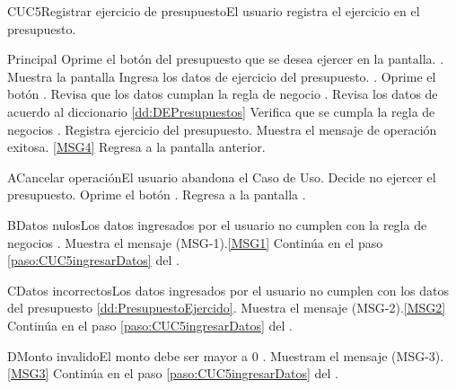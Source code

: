 
	\begin{UseCase}{CUC5}{Registrar ejercicio de presupuesto}{El usuario registra el ejercicio en el presupuesto.}
	\end{UseCase}

	\begin{UCtrayectoria}{Principal}
			\UCpaso[\UCactor] Oprime el botón  del presupuesto que se desea ejercer en la pantalla. .
			\UCpaso Muestra la pantalla  
			\UCpaso [\UCactor] Ingresa los datos de ejercicio del presupuesto.  \label{paso:CUC5ingresarDatos}.
			\UCpaso [\UCactor] Oprime el botón .
			\UCpaso Revisa que los datos cumplan la regla de negocio . 
			\UCpaso Revisa los datos de acuerdo al diccionario \ref{dd:DEPresupuestos} 
			\UCpaso Verifica que se cumpla la regla de negocios .
			\UCpaso Registra ejercicio del presupuesto.
			\UCpaso Muestra el mensaje de operación exitosa. \ref{MSG4}
			\UCpaso Regresa a la pantalla anterior.
	\end{UCtrayectoria}
	\newpage
	\begin{UCtrayectoriaA}{A}{Cancelar operación}{El usuario abandona el Caso de Uso.}
			\UCpaso[\UCactor] Decide no ejercer el presupuesto.
			\UCpaso[\UCactor] Oprime el botón .
			\UCpaso Regresa a la pantalla .
	\end{UCtrayectoriaA}
		
	\begin{UCtrayectoriaA}{B}{Datos nulos}{Los datos ingresados por el usuario  no cumplen con la regla de negocios .}
			\UCpaso Muestra el mensaje (MSG-1).\ref{MSG1}
			\UCpaso Continúa en el paso \ref{paso:CUC5ingresarDatos} del .
	\end{UCtrayectoriaA}
	\begin{UCtrayectoriaA}{C}{Datos incorrectos}{Los datos ingresados por el usuario  no cumplen con los datos del presupuesto \ref{dd:PresupuestoEjercido}.}
			\UCpaso Muestra el mensaje (MSG-2).\ref{MSG2}
			\UCpaso Continúa en el paso \ref{paso:CUC5ingresarDatos} del .
	\end{UCtrayectoriaA}

	\begin{UCtrayectoriaA}{D}{Monto invalido}{El monto debe ser mayor a 0 .}
		\UCpaso Muestram el mensaje (MSG-3). \ref{MSG3}
		\UCpaso Continúa en el paso \ref{paso:CUC5ingresarDatos} del .
	\end{UCtrayectoriaA}

